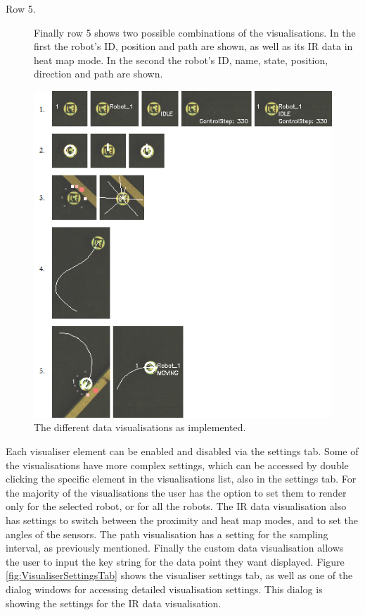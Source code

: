 \begin{description}
\item [Row 5.] Finally row 5 shows two possible combinations of the visualisations. In the first the robot's ID, position and path are shown, as well as its IR data in heat map mode. In the second the robot's ID, name, state, position, direction and path are shown.
\end{description}

\vspace{2cm}
\begin{figure}[h]
	\centering
	\includegraphics[scale=1]{Figures/Overlays.png}
	\decoRule
	\caption[Data Visualisations]{The different data visualisations as implemented.}
	\label{fig:Overlays}
\end{figure}

\clearpage
Each visualiser element can be enabled and disabled via the settings tab. Some of the visualisations have more complex settings, which can be accessed by double clicking the specific element in the visualisations list, also in the settings tab. For the majority of the visualisations the user has the option to set them to render only for the selected robot, or for all the robots. The IR data visualisation also has settings to switch between the proximity and heat map modes, and to set the angles of the sensors. The path visualisation has a setting for the sampling interval, as previously mentioned. Finally the custom data visualisation allows the user to input the key string for the data point they want displayed. Figure \ref{fig:VisualiserSettingsTab} shows the visualiser settings tab, as well as one of the dialog windows for accessing detailed visualisation settings. This dialog is showing the settings for the IR data visualisation.

